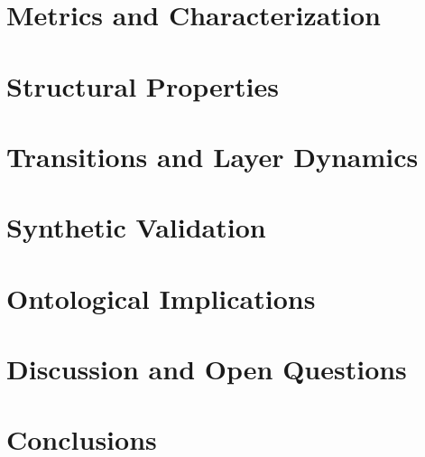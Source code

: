 \documentclass[11pt,a4paper]{article}
\begin{document}
\section{Metrics and Characterization}


\section{Structural Properties}


\section{Transitions and Layer Dynamics}


\section{Synthetic Validation}


\section{Ontological Implications}


\section{Discussion and Open Questions}


\section{Conclusions}




\end{document}
